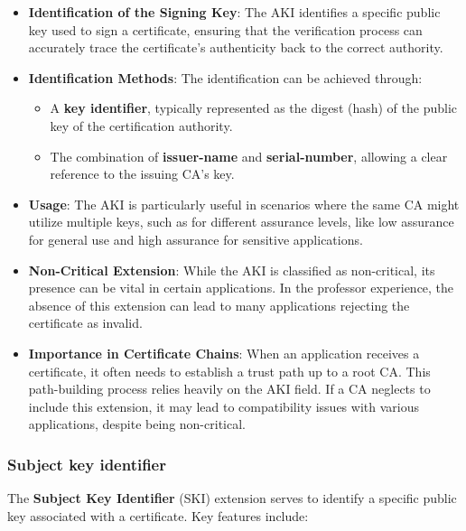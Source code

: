 \begin{itemize}
  \item \textbf{Identification of the Signing Key}: The AKI identifies
    a specific public key used to sign a certificate, ensuring that
    the verification process can accurately trace the certificate's
    authenticity back to the correct authority.

  \item \textbf{Identification Methods}: The identification can be
    achieved through:
    \begin{itemize}
      \item A \textbf{key identifier}, typically represented as the
        digest (hash) of the public key of the certification authority.
      \item The combination of \textbf{issuer-name} and 
        \textbf{serial-number}, allowing a clear reference to the
        issuing CA's key.
    \end{itemize}

  \item \textbf{Usage}: The AKI is particularly useful in scenarios
    where the same CA might utilize multiple keys, such as for 
    different assurance levels, like low assurance for general use 
    and high assurance for sensitive applications.

  \item \textbf{Non-Critical Extension}: While the AKI is classified 
    as non-critical, its presence can be vital in certain 
    applications. In the professor experience, the absence of this 
    extension can lead to many applications rejecting the certificate
    as invalid.

  \item \textbf{Importance in Certificate Chains}: When an 
    application receives a certificate, it often needs to establish 
    a trust path up to a root CA. This path-building process relies 
    heavily on the AKI field. If a CA neglects to include this 
    extension, it may lead to compatibility issues with various 
    applications, despite being non-critical.
\end{itemize}

\subsubsection{Subject key identifier}
The \textbf{Subject Key Identifier} (SKI) extension serves
to identify a specific public key associated with a certificate. Key
features include:

